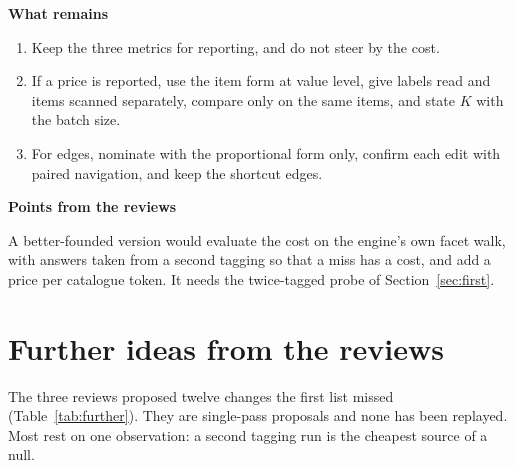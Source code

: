 \documentclass[10pt,a4paper]{article}
\newcommand{\lab}[1]{\par\vspace{0.35em}\textbf{#1}\par\nobreak}
\begin{document}
\lab{What remains}
\begin{enumerate}
\item Keep the three metrics for reporting, and do not steer by the cost.
\item If a price is reported, use the item form at value level, give labels read and items scanned separately, compare only on the same items, and state $K$ with the batch size.
\item For edges, nominate with the proportional form only, confirm each edit with paired navigation, and keep the shortcut edges.
\end{enumerate}

\lab{Points from the reviews}
A better-founded version would evaluate the cost on the engine's own facet walk, with answers taken from a
second tagging so that a miss has a cost, and add a price per catalogue token. It needs the twice-tagged
probe of Section~\ref{sec:first}.

\section{Further ideas from the reviews}
\label{sec:further}

The three reviews proposed twelve changes the first list missed (Table~\ref{tab:further}). They are
single-pass proposals and none has been replayed. Most rest on one observation: a second tagging run is the
cheapest source of a null.
\end{document}
